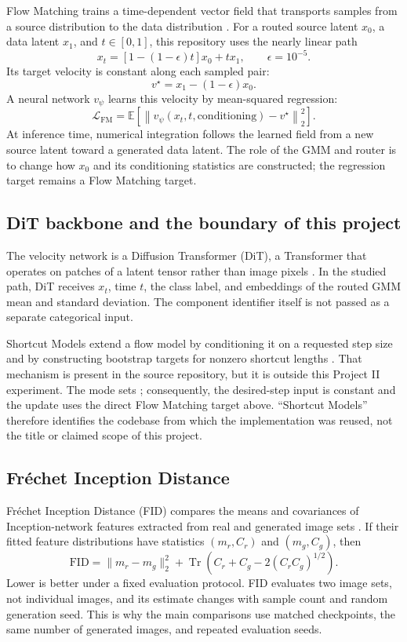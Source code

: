 \documentclass[11pt,a4paper]{article}
\newcommand{\fid}{\mathrm{FID}}
\newcommand{\metric}[1]{\texttt{\small\detokenize{#1}}}
\begin{document}
Flow Matching trains a time-dependent vector field that transports samples
from a source distribution to the data distribution
\cite{lipman2023flow}. For a routed source latent \(x_0\), a data latent
\(x_1\), and \(t\in[0,1]\), this repository uses the nearly linear path
\[
 x_t=\left[1-(1-\epsilon)t\right]x_0+t x_1,
 \qquad \epsilon=10^{-5}.
\]
Its target velocity is constant along each sampled pair:
\[
 v^\star=x_1-(1-\epsilon)x_0.
\]
A neural network \(v_\psi\) learns this velocity by mean-squared regression:
\[
 \mathcal L_{\mathrm{FM}}
 =\mathbb E\!\left[
 \left\|v_\psi(x_t,t,\text{conditioning})-v^\star\right\|_2^2
 \right].
\]
At inference time, numerical integration follows the learned field from a new
source latent toward a generated data latent. The role of the GMM and router is
to change how \(x_0\) and its conditioning statistics are constructed; the
regression target remains a Flow Matching target.

\subsection{DiT backbone and the boundary of this project}

The velocity network is a Diffusion Transformer (DiT), a Transformer that
operates on patches of a latent tensor rather than image pixels
\cite{peebles2023dit}. In the studied path, DiT receives \(x_t\), time \(t\),
the class label, and embeddings of the routed GMM mean and standard deviation.
The component identifier itself is not passed as a separate categorical input.

Shortcut Models extend a flow model by conditioning it on a requested step
size and by constructing bootstrap targets for nonzero shortcut lengths
\cite{frans2024shortcut}. That mechanism is present in the source repository,
but it is outside this Project II experiment. The \metric{gmm-tide} mode sets
\metric{ignore_dt=True}; consequently, the desired-step input is constant and
the update uses the direct Flow Matching target above. “Shortcut Models”
therefore identifies the codebase from which the implementation was reused,
not the title or claimed scope of this project.

\subsection{Fréchet Inception Distance}

Fréchet Inception Distance (FID) compares the means and covariances of
Inception-network features extracted from real and generated image sets
\cite{heusel2017fid}. If their fitted feature distributions have statistics
\((m_r,C_r)\) and \((m_g,C_g)\), then
\[
 \fid
 =\|m_r-m_g\|_2^2
 +\operatorname{Tr}\!\left(
 C_r+C_g-2(C_rC_g)^{1/2}
 \right).
\]
Lower is better under a fixed evaluation protocol. FID evaluates two image
sets, not individual images, and its estimate changes with sample count and
random generation seed. This is why the main comparisons use matched
checkpoints, the same number of generated images, and repeated evaluation
seeds.
\end{document}
